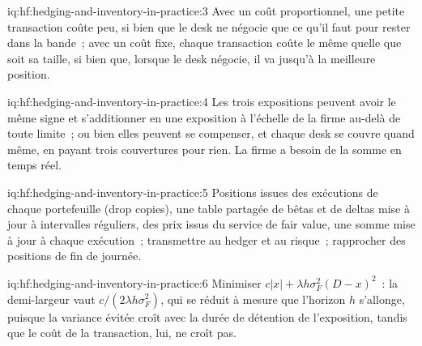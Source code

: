 \begin{solution}{iq:hf:hedging-and-inventory-in-practice:3}
Avec un coût proportionnel, une petite transaction coûte peu, si bien que le desk ne négocie que ce qu'il faut pour rester dans la bande~; avec un coût fixe, chaque transaction coûte
le même quelle que soit sa taille, si bien que, lorsque le desk négocie, il va jusqu'à la meilleure position.
\end{solution}

\begin{solution}{iq:hf:hedging-and-inventory-in-practice:4}
Les trois expositions peuvent avoir le même signe et s'additionner en une exposition à l'échelle de la firme au-delà de toute limite~; ou bien elles peuvent se compenser, et chaque desk se couvre
quand même, en payant trois couvertures pour rien. La firme a besoin de la somme en temps réel.
\end{solution}

\begin{solution}{iq:hf:hedging-and-inventory-in-practice:5}
Positions issues des exécutions de chaque portefeuille (drop copies), une table partagée de bêtas et de deltas mise à jour à intervalles réguliers, des prix issus du service de fair value, une somme
mise à jour à chaque exécution~; transmettre au hedger et au risque~; rapprocher des positions de fin de journée.
\end{solution}

\begin{solution}{iq:hf:hedging-and-inventory-in-practice:6}
Minimiser $c|x|+\lambda h\sigma_F^2(D-x)^2$~: la demi-largeur vaut $c/(2\lambda h\sigma_F^2)$, qui se réduit à mesure que l'horizon $h$ s'allonge, puisque la variance
évitée croît avec la durée de détention de l'exposition, tandis que le coût de la transaction, lui, ne croît pas.
\end{solution}
